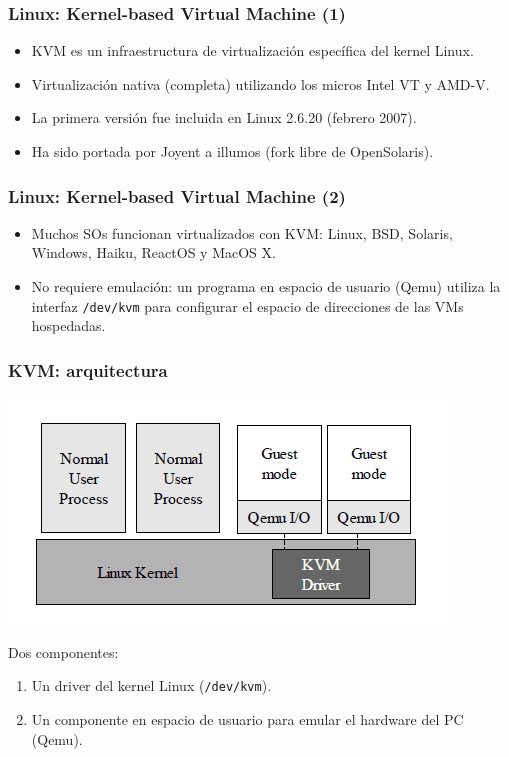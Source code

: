 \documentclass{beamer}
\begin{document}
\begin{frame}
\frametitle{Linux: Kernel-based Virtual Machine (1)}

\begin{itemize}
\item KVM es un infraestructura de virtualización específica del kernel Linux.
\item Virtualización nativa (completa) utilizando los micros Intel VT y AMD-V.
\item La primera versión fue incluida en Linux 2.6.20 (febrero 2007).
\item Ha sido portada por Joyent a illumos (fork libre de OpenSolaris).
\end{itemize}

\end{frame}


\begin{frame}
\frametitle{Linux: Kernel-based Virtual Machine (2)}

\begin{itemize}
\item Muchos SOs funcionan virtualizados con KVM: Linux, BSD, Solaris, Windows, Haiku, ReactOS y  MacOS X.
\item No requiere emulación: un programa en espacio de usuario (Qemu) utiliza la interfaz \texttt{/dev/kvm} para configurar el espacio de direcciones de las VMs hospedadas.
\end{itemize}

\end{frame}


\begin{frame}
\frametitle{KVM: arquitectura}

\begin{center}
\includegraphics[scale=0.40,clip=false]{figs/kvm_architecture.png}
\end{center}

Dos componentes:
\begin{enumerate}
\item Un driver del kernel Linux (\texttt{/dev/kvm}).
\item Un componente en espacio de usuario para emular el hardware del PC (Qemu).
\end{enumerate}
\end{frame}
\end{document}
